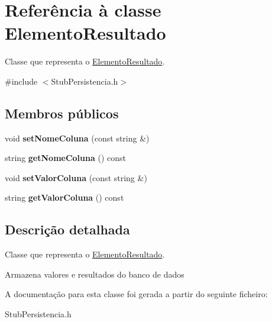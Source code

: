 \hypertarget{class_elemento_resultado}{
\section{\-Referência à classe \-Elemento\-Resultado}
\label{class_elemento_resultado}
}


\-Classe que representa o \hyperlink{class_elemento_resultado}{\-Elemento\-Resultado}.  




{\ttfamily \#include $<$\-Stub\-Persistencia.\-h$>$}

\subsection*{\-Membros públicos}
\begin{DoxyCompactItemize}
\item 
\hypertarget{class_elemento_resultado_a56cad42cd197c5a9f513b4d4f451d384}{
void {\bfseries set\-Nome\-Coluna} (const string \&)}
\label{class_elemento_resultado_a56cad42cd197c5a9f513b4d4f451d384}

\item 
\hypertarget{class_elemento_resultado_acbdde0b8cbfa265f9d8d4b91157d4888}{
string {\bfseries get\-Nome\-Coluna} () const }
\label{class_elemento_resultado_acbdde0b8cbfa265f9d8d4b91157d4888}

\item 
\hypertarget{class_elemento_resultado_ad5a4179804f62ddb3a17f0d551c83a80}{
void {\bfseries set\-Valor\-Coluna} (const string \&)}
\label{class_elemento_resultado_ad5a4179804f62ddb3a17f0d551c83a80}

\item 
\hypertarget{class_elemento_resultado_af9f53c91d1b5085c9fe8070639563bee}{
string {\bfseries get\-Valor\-Coluna} () const }
\label{class_elemento_resultado_af9f53c91d1b5085c9fe8070639563bee}

\end{DoxyCompactItemize}


\subsection{\-Descrição detalhada}
\-Classe que representa o \hyperlink{class_elemento_resultado}{\-Elemento\-Resultado}. 

\-Armazena valores e resultados do banco de dados 

\-A documentação para esta classe foi gerada a partir do seguinte ficheiro\-:\begin{DoxyCompactItemize}
\item 
\-Stub\-Persistencia.\-h\end{DoxyCompactItemize}
